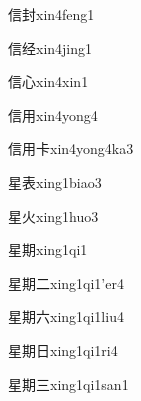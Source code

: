 \begin{verbete}[9;9]{信封}{xin4feng1}
\end{verbete}

\begin{verbete}[9;8]{信经}{xin4jing1}
\end{verbete}

\begin{verbete}[9;4]{信心}{xin4xin1}
\end{verbete}

\begin{verbete}[9;5]{信用}{xin4yong4}
\end{verbete}

\begin{verbete}[9;5;5]{信用卡}{xin4yong4ka3}
\end{verbete}

\begin{verbete}[9;8]{星表}{xing1biao3}
\end{verbete}

\begin{verbete}[9;4]{星火}{xing1huo3}
\end{verbete}

\begin{verbete}[9;12]{星期}{xing1qi1}
\end{verbete}

\begin{verbete}[9;12;2]{星期二}{xing1qi1'er4}
\end{verbete}

\begin{verbete}[9;12;3]{星期六}{xing1qi1liu4}
\end{verbete}

\begin{verbete}[9;12;4]{星期日}{xing1qi1ri4}
\end{verbete}

\begin{verbete}[9;12;3]{星期三}{xing1qi1san1}
\end{verbete}

